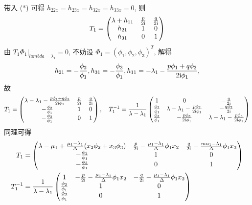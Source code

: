带入 (*) 可得 $ h_{22x} = h_{23x} = h_{32x} = h_{33x} = 0 $, 则 
\begin{equation}
    T_{1} = \begin{pmatrix}
        \lambda + h_{11} & \frac{p}{2\mathrm{i}} & \frac{q}{2\mathrm{i}} \\
        h_{21} & 1 & 0 \\
        h_{31} & 0 & 1
    \end{pmatrix}
\end{equation}
由 $ T_{1}\Phi_{1}|_{lambda = \lambda_{1}} = 0 $, 不妨设 $ \Phi_{1} = (\phi_{1}, \phi_{2},\phi_{3})^{T} $, 解得 
\begin{equation}
    h_{21} = - \frac{\phi_{2}}{\phi_{1}}, h_{31} = - \frac{\phi_{3}}{\phi_{1}}, h_{11} = -\lambda_{1} -  \frac{p\phi_{1} + q \phi_{3}}{2\mathrm{i} \phi_{1}}, 
\end{equation}
故 
\begin{equation*}
    T_{1} = \begin{pmatrix}
        \lambda -\lambda_{1} - \frac{p\phi_{1} + q \phi_{3}}{2\mathrm{i} \phi_{1}} & \frac{p}{2\mathrm{i}} & \frac{q}{2\mathrm{i}} \\
        - \frac{\phi_{2}}{\phi_{1}} & 1 & 0 \\
        - \frac{\phi_{3}}{\phi_{1}} & 0 & 1
    \end{pmatrix}, \quad 
    T_{1}^{-1} = \frac{1}{\lambda - \lambda_{1}}\begin{pmatrix}
        1 & 0 & -\frac{q}{2\mathrm{i}} \\
        \frac{\phi_{2}}{\phi_{1}} & \lambda - \lambda_{1} - \frac{p\phi_{2}}{2\mathrm{i} \phi_{1}} & -\frac{q\phi_{2}}{2\mathrm{i}} \\
        \frac{\phi_{3}}{\phi_{1}} & -\frac{p\phi_{3}}{2\mathrm{i} \phi_{1}} & \lambda - \lambda_{1} - \frac{p\phi_{3}}{2\mathrm{i} \phi_{1}}
    \end{pmatrix}
\end{equation*}
同理可得 
\begin{equation*}
    \begin{aligned}
        T_{1} &= \begin{pmatrix}
            \lambda -\mu_{1} + \frac{\mu_{1}-\lambda_{1}}{\Delta}(x_{2}\phi_{2} + x_{3}\phi_{3}) & \frac{p}{2\mathrm{i}} - \frac{\mu_{1}-\lambda_{1}}{\Delta}\phi_{1}x_{2} & \frac{q}{2\mathrm{i}} - \frac{mu_{1}-\lambda_{1}}{\Delta}\phi_{1}x_{3} \\
            - \frac{\phi_{2}}{\phi_{1}} & 1 & 0 \\
            - \frac{\phi_{3}}{\phi_{1}} & 0 & 1
        \end{pmatrix} \\
        T_{1}^{-1} &= \frac{1}{\lambda - \lambda_{1}}\begin{pmatrix}
            1 & -\frac{p}{2\mathrm{i}} - \frac{\mu_{1}-\lambda_{1}}{\Delta}\phi_{1}x_{2} & -\frac{q}{2\mathrm{i}} - \frac{\mu_{1}-\lambda_{1}}{\Delta}\phi_{1}x_{2} \\
            \frac{\phi_{2}}{\phi_{1}} & 1 & 0 \\
            \frac{\phi_{3}}{\phi_{1}} & 0 & 1
        \end{pmatrix}
    \end{aligned}
\end{equation*}
